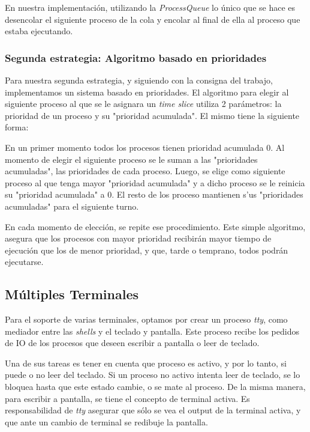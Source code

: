 \documentclass[a4paper,10pt]{article}
\begin{document}
	En nuestra implementación, utilizando la \textit{ProcessQueue} lo único que se hace es desencolar el siguiente proceso 
	de la cola y encolar al final de ella al proceso que estaba ejecutando.

        \subsubsection{Segunda estrategia: Algoritmo basado en prioridades}
        Para nuestra segunda estrategia, y siguiendo con la consigna del trabajo, implementamos un sistema basado en 
        prioridades. El algoritmo para elegir al siguiente proceso al que se le asignara un \textit{time slice} utiliza
        2 parámetros: la prioridad de un proceso y su "prioridad acumulada". El mismo tiene la siguiente forma:

        En un primer momento todos los procesos tienen prioridad acumulada 0. Al momento de elegir el siguiente proceso
        se le suman a las "prioridades acumuladas", las prioridades de cada proceso. Luego, se elige como siguiente 
        proceso al que tenga mayor "prioridad acumulada" y a dicho proceso se le reinicia su "prioridad acumulada" a 0.
        El resto de los proceso mantienen s'us "prioridades acumuladas" para el siguiente turno. 

        En cada momento de elección, se repite ese procedimiento. Este simple algoritmo, asegura que los procesos con 
        mayor prioridad recibirán mayor tiempo de ejecución que los de menor prioridad, y que, tarde o temprano, todos
        podrán ejecutarse.

\subsection{Múltiples Terminales}
Para el soporte de varias terminales, optamos por crear un proceso \textit{tty}, como mediador entre las \textit{shells} y el teclado y pantalla.
Este proceso recibe los pedidos de IO de los procesos que deseen escribir a pantalla o leer de teclado.

Una de sus tareas es tener en cuenta que proceso es activo, y por lo tanto, si puede o no leer del teclado.
Si un proceso no activo intenta leer de teclado, se lo bloquea hasta que este estado cambie, o se mate al proceso.
De la misma manera, para escribir a pantalla, se tiene el concepto de terminal activa.
Es responsabilidad de \textit{tty} asegurar que sólo se vea el output de la terminal activa, y que ante un cambio de terminal se redibuje la pantalla.
\end{document}
